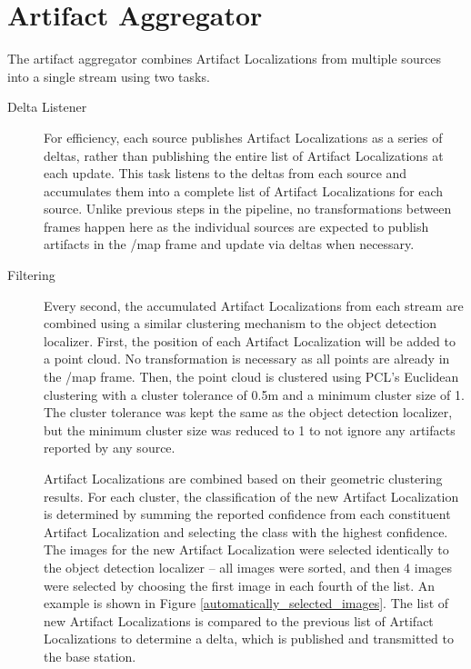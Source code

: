 \section{Artifact Aggregator}

The artifact aggregator combines Artifact Localizations from multiple sources into a single stream using two tasks. 

\begin{description}
	\item[Delta Listener] For efficiency, each source publishes Artifact Localizations as a series of deltas, rather than publishing the entire list of Artifact Localizations at each update. This task listens to the deltas from each source and accumulates them into a complete list of Artifact Localizations for each source. Unlike previous steps in the pipeline, no transformations between frames happen here as the individual sources are expected to publish artifacts in the /map frame and update via deltas when necessary.
	\item[Filtering] Every second, the accumulated Artifact Localizations from each stream are combined using a similar clustering mechanism to the object detection localizer. First, the position of each Artifact Localization will be added to a point cloud. No transformation is necessary as all points are already in the /map frame. Then, the point cloud is clustered using PCL's Euclidean clustering with a cluster tolerance of 0.5m and a minimum cluster size of 1. The cluster tolerance was kept the same as the object detection localizer, but the minimum cluster size was reduced to 1 to not ignore any artifacts reported by any source.
	
	Artifact Localizations are combined based on their geometric clustering results. For each cluster, the classification of the new Artifact Localization is determined by summing the reported confidence from each constituent Artifact Localization and selecting the class with the highest confidence. The images for the new Artifact Localization were selected identically to the object detection localizer -- all images were sorted, and then 4 images were selected by choosing the first image in each fourth of the list. An example is shown in Figure \ref{automatically_selected_images}. The list of new Artifact Localizations is compared to the previous list of Artifact Localizations to determine a delta, which is published and transmitted to the base station.
	
\end{description}

